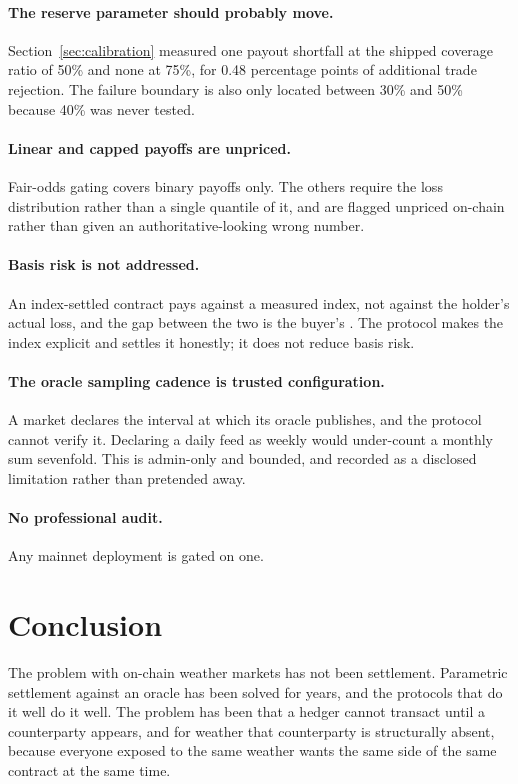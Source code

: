 \documentclass[11pt,a4paper]{article}
\begin{document}
\paragraph{The reserve parameter should probably move.} Section~\ref{sec:calibration}
measured one payout shortfall at the shipped coverage ratio of 50\% and none at 75\%, for
0.48 percentage points of additional trade rejection. The failure boundary is also only
located between 30\% and 50\% because 40\% was never tested.

\paragraph{Linear and capped payoffs are unpriced.} Fair-odds gating covers binary payoffs
only. The others require the loss distribution rather than a single quantile of it, and are
flagged unpriced on-chain rather than given an authoritative-looking wrong number.

\paragraph{Basis risk is not addressed.} An index-settled contract pays against a measured
index, not against the holder's actual loss, and the gap between the two is the buyer's
\cite{woodard2008}. The protocol makes the index explicit and settles it honestly; it does
not reduce basis risk.

\paragraph{The oracle sampling cadence is trusted configuration.} A market declares the
interval at which its oracle publishes, and the protocol cannot verify it. Declaring a daily
feed as weekly would under-count a monthly sum sevenfold. This is admin-only and bounded, and
recorded as a disclosed limitation rather than pretended away.

\paragraph{No professional audit.} Any mainnet deployment is gated on one.

\section{Conclusion}

The problem with on-chain weather markets has not been settlement. Parametric settlement
against an oracle has been solved for years, and the protocols that do it well do it well.
The problem has been that a hedger cannot transact until a counterparty appears, and for
weather that counterparty is structurally absent, because everyone exposed to the same
weather wants the same side of the same contract at the same time.
\end{document}
